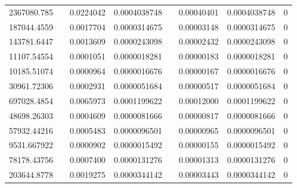 \documentclass[
journal=jacsat, %
manuscript=article]{achemso}
\begin{document}
\begin{table}[htbp]
{\begin{tabular}{rrrrrrrr}
    2367080.785 &       & 0.0224042 & 0.0004038748 &       & 0.00040401 & 0.0004038748 & 0 \\
    187044.4559 &       & 0.0017704 & 0.0000314675 &       & 0.00003148 & 0.0000314675 & 0 \\
    143781.6447 &       & 0.0013609 & 0.0000243098 &       & 0.00002432 & 0.0000243098 & 0 \\
    11107.54554 &       & 0.0001051 & 0.0000018281 &       & 0.00000183 & 0.0000018281 & 0 \\
    10185.51074 &       & 0.0000964 & 0.0000016676 &       & 0.00000167 & 0.0000016676 & 0 \\
    30961.72306 &       & 0.0002931 & 0.0000051684 &       & 0.00000517 & 0.0000051684 & 0 \\
    697028.4854 &       & 0.0065973 & 0.0001199622 &       & 0.00012000 & 0.0001199622 & 0 \\
    48698.26303 &       & 0.0004609 & 0.0000081666 &       & 0.00000817 & 0.0000081666 & 0 \\
    57932.44216 &       & 0.0005483 & 0.0000096501 &       & 0.00000965 & 0.0000096501 & 0 \\
    9531.667922 &       & 0.0000902 & 0.0000015492 &       & 0.00000155 & 0.0000015492 & 0 \\
    78178.43756 &       & 0.0007400 & 0.0000131276 &       & 0.00001313 & 0.0000131276 & 0 \\
    203644.8778 &       & 0.0019275 & 0.0000344142 &       & 0.00003443 & 0.0000344142 & 0 \\
    \bottomrule
    \end{tabular}%
    }
  \label{tab:addlabel}%
\end{table}%
\end{document}
